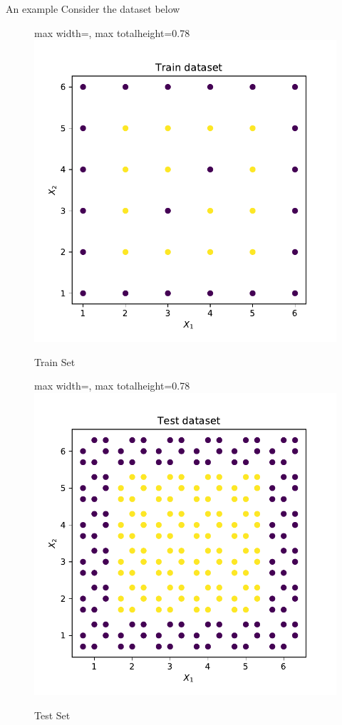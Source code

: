 \documentclass[aspectratio=169,10pt]{beamer}
\newcommand{\fitpic}[1]{\begin{adjustbox}{max width=\linewidth, max totalheight=0.78\textheight}#1\end{adjustbox}}
\begin{document}
	\begin{frame}{An example}
	Consider the dataset below
	\begin{figure}[h]
	    \centering
	    \begin{minipage}{0.45\textwidth}
	        \centering
	        \fitpic{\includegraphics[width=\textwidth]{dataset-2-train}}
	        \caption{Train Set}
	    \end{minipage}
	    \hfill
	    \begin{minipage}{0.45\textwidth}
	        \centering
	        \fitpic{\includegraphics[width=\textwidth]{dataset-2-test}}
	        \caption{Test Set}
	    \end{minipage}
	\end{figure}
	\end{frame}
\end{document}
